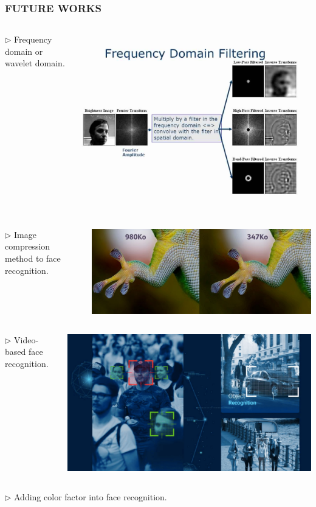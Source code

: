\documentclass{beamer}
\begin{document}
\begin{frame}

\frametitle{FUTURE WORKS}\pause
\begin{itemize}
\begin{columns}
\begin{column}{.4\textwidth}
\item[$\triangleright$] Frequency domain or wavelet domain.\pause
\end{column}
\begin{column}{.5\textwidth}
\includegraphics[width=.5\textwidth]{freq.jpg}\pause
\end{column}
\end{columns}
\begin{columns}
\begin{column}{.4\textwidth}
\item[$\triangleright$] Image compression method to face recognition.\pause
\end{column}
\begin{column}{.5\textwidth}
\includegraphics[width=.5\textwidth]{compression.jpg}\pause
\end{column}
\end{columns}
\begin{columns}
\begin{column}{.4\textwidth}
\item[$\triangleright$] Video-based face recognition.\pause
\end{column}
\begin{column}{.5\textwidth}
\includegraphics[width=.5\textwidth]{videoface.png}\pause
\end{column}
\end{columns}
\begin{columns}
\begin{column}{.4\textwidth}
\item[$\triangleright$] Adding color factor into face recognition.\pause
\end{column}



\end{columns}
\end{itemize}
\end{frame}
\end{document}

